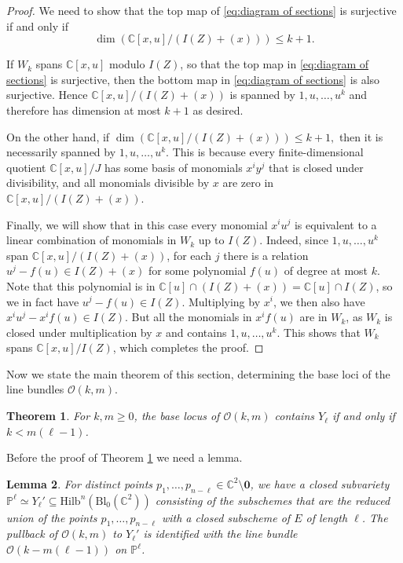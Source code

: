 \documentclass[12pt]{amsart}
\newcommand{\Hilb}{\mathrm{Hilb}}
\newcommand{\C}{\mathbb{C}}
\renewcommand{\P}{\mathbb{P}}
\newcommand{\CO}{\mathcal{O}}
\newcommand{\Bl}{\mathrm{Bl}}
\numberwithin{equation}{section}
\newtheorem{theorem}{Theorem}[section]
\newtheorem{lemma}[theorem]{Lemma}
\theoremstyle{definition}
\begin{document}
\begin{proof}
    We need to show that the top map of \eqref{eq:diagram of sections} is surjective if and only if \[ \dim(\C[x,u]/(I(Z)+(x)))\leq k+1.\]

    If $W_k$ spans $\C[x,u]$ modulo $I(Z)$, so that the top map in \eqref{eq:diagram of sections} is surjective, then the bottom map in \eqref{eq:diagram of sections} is also surjective. Hence $\C[x,u]/(I(Z)+(x))$ is spanned by $1,u,\dots,u^k$ and therefore has dimension at most $k+1$ as desired.

    On the other hand, if $\dim(\C[x,u]/(I(Z)+(x)))\leq k+1,$ then it is necessarily spanned by $1,u,\dots,u^k$. This is because every finite-dimensional quotient $\C[x,u]/J$ has some basis of monomials $x^iy^j$ that is closed under divisibility, and all monomials divisible by $x$ are zero in $\C[x,u]/(I(Z)+(x))$.

    Finally, we will show that in this case every monomial $x^iu^j$ is equivalent to a linear combination of monomials in $W_k$ up to $I(Z)$. Indeed, since $1,u,\dots,u^k$ span $\C[x,u]/(I(Z)+(x))$, for each $j$ there is a relation $u^j -f(u) \in I(Z)+(x)$ for some polynomial $f(u)$ of degree at most $k$. Note that this polynomial is in $\C[u] \cap \left(I(Z)+(x) \right) = \C[u]\cap I(Z)$, so we in fact have $u^j -f(u) \in I(Z)$. Multiplying by $x^i$, we then also have $x^iu^j-x^if(u) \in I(Z)$. But all the monomials in $x^if(u)$ are in $W_k$, as $W_k$ is closed under multiplication by $x$ and contains $1,u,\dots,u^k$. This shows that $W_k$ spans $\C[x,u]/I(Z)$, which completes the proof.
\end{proof}

Now we state the main theorem of this section, determining the base loci of the line bundles $\CO(k,m)$.

\begin{theorem}\label{thm:base locus}
    For $k,m\geq 0$, the base locus of $\CO(k,m)$ contains $Y_\ell$ if and only if $k<m(\ell-1)$.
\end{theorem}

Before the proof of Theorem \ref{thm:base locus} we need a lemma.

\begin{lemma}\label{lem:pullback to P^l}
    For distinct points $p_1,\dots,p_{n-\ell}\in\C^2\setminus \mathbf{0}$, we have a closed subvariety $\P^\ell\simeq Y_\ell' \subseteq \Hilb^n(\Bl_0 (\C^2))$ consisting of the subschemes that are the reduced union of the points $p_1,\dots,p_{n-\ell}$ with a closed subscheme of $E$ of length $\ell$. The pullback of $\CO(k,m)$ to $Y_\ell'$ is identified with the line bundle $\CO(k-m(\ell-1))$ on $\P^\ell$.
\end{lemma}
\end{document}
